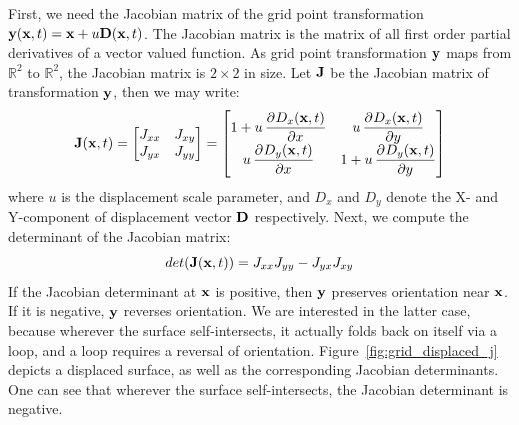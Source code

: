 %
First, we need the Jacobian matrix of the grid point transformation 
$\mathbf{y}(\mathbf{x},t)=\mathbf{x}+u\mathbf{D}(\mathbf{x},t)$. The Jacobian matrix is 
the matrix of all first order partial derivatives of a vector valued function. 
As grid point transformation $\mathbf{y}$ maps from $\mathbb{R}^2$ to 
$\mathbb{R}^2$, the Jacobian matrix is $2\times 2$ in size. Let $\mathbf{J}$ be 
the Jacobian matrix of transformation $\mathbf{y}$, then we may write:
%
\begin{equation}
 \label{eq:jacobian_of_displacement}
 \mvec{J}(\mvec{x},t) =
 \begin{bmatrix}
 J_{xx} & J_{xy} \\
 J_{yx} & J_{yy}
 \end{bmatrix}
 =
 \begin{bmatrix}
   1 + u\dpd{D_x(\mvec{x},t)}{x} & u\dpd{D_x(\mvec{x},t)}{y} \\
   u\dpd{D_y(\mvec{x},t)}{x} & 1 + u\dpd{D_y(\mvec{x},t)}{y}
 \end{bmatrix}
\end{equation}
where $u$ is the displacement scale parameter, and $D_x$ and $D_y$ denote the X-
and Y-component of displacement vector $\mathbf{D}$ respectively.
Next, we compute the determinant of the Jacobian matrix:
\begin{equation}
 det(\mathbf{J}(\mathbf{x},t)) = J_{xx}J_{yy}-J_{yx}J_{xy}
\end{equation}
%
If the Jacobian determinant at $\mathbf{x}$ is positive, then $\mathbf{y}$ 
preserves orientation near $\mathbf{x}$. If it is negative, $\mathbf{y}$ reverses 
orientation. We are interested in the latter case, because wherever the 
surface self-intersects, it actually folds back on itself via a loop, and a 
loop requires a reversal of orientation. Figure~\ref{fig:grid_displaced_j} 
depicts a displaced surface, as well as the corresponding Jacobian 
determinants. One can see that wherever the surface self-intersects, the 
Jacobian determinant is negative.


